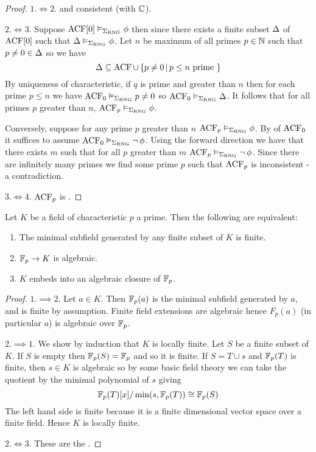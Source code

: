 \begin{proof}
  $1. \iff 2.$  and consistent (with $\mathbb{C}$).

  $2. \iff 3.$ Suppose $\operatorname{ACF}[0] \vDash_{\Sigma_{\mathrm{RNG}}} \phi$
  then since 
  there exists a finite subset $\Delta$ of $\operatorname{ACF}[0]$ such that
  $\Delta \vDash_{\Sigma_{\mathrm{RNG}}} \phi$.
  Let $n$ be maximum of all primes $p \in \mathbb{N}$ such that
  $p \ne 0 \in \Delta$ so we have
  \[\Delta \subseteq \operatorname{ACF} \cup \left\{p \ne 0 \,|\, p \leq n \text{ prime }\right\}\]
  By uniqueness of characteristic,
  if $q$ is prime and greater than $n$ then for each prime $p \leq n$
  we have $\operatorname{ACF}_{0} \vDash_{\Sigma_{\mathrm{RNG}}} p \ne 0$
  so $\operatorname{ACF}_{0} \vDash_{\Sigma_{\mathrm{RNG}}} \Delta$.
  It follows that for all primes $p$ greater than $n$,
  $\operatorname{ACF}_p \vDash_{\Sigma_{\mathrm{RNG}}} \phi$.

  Conversely, suppose for any prime $p$ greater than $n$
  $\operatorname{ACF}_p \vDash_{\Sigma_{\mathrm{RNG}}} \phi$.
  By  of
  $\operatorname{ACF}_{0}$ it suffices to assume $\operatorname{ACF}_{0} \vDash_{\Sigma_{\mathrm{RNG}}} \neg\, \phi$.
  Using the forward direction we have that there exists
  $m$ such that for all $p$ greater than $m$
  $\operatorname{ACF}_p \vDash_{\Sigma_{\mathrm{RNG}}} \neg\, \phi$.
  Since there are infinitely many primes we find some prime $p$
  such that $\operatorname{ACF}_{p}$ is inconsistent - a contradiction.

  $3. \iff 4.$ $\operatorname{ACF}_p$ is .
\end{proof}

\begin{dfn}
    Let $K$ be a field of characteristic $p$ a prime.
    Then the following are equivalent:
    \begin{enumerate}
        \item The minimal subfield generated by any finite subset of $K$ is finite.
        \item $\mathbb{F}_p \to K$ is algebraic.
        \item $K$ embeds into an algebraic closure of $\mathbb{F}_p$.
    \end{enumerate}
\end{dfn}
\begin{proof}
  $1.\implies 2.$
  Let $a \in K$. Then $\mathbb{F}_{p}(a)$ is the minimal subfield generated by $a$,
  and is finite by assumption.
  Finite field extensions are algebraic hence $F_{p}(a)$
  (in particular $a$) is algebraic over $\mathbb{F}_{p}$.

  $2. \implies 1.$ We show by induction that $K$ is locally
  finite.
  Let $S$ be a finite subset of $K$.
  If $S$ is empty then $\mathbb{F}_p(S) = \mathbb{F}_p$ and so it is finite.
  If $S = T \cup {s}$ and $\mathbb{F}_p(T)$ is finite,
  then $s \in K$ is algebraic so by some basic field theory we can
  take the quotient by the minimal polynomial of $s$ giving
  \[\mathbb{F}_p(T)[x] / \min (s, \mathbb{F}_p(T)) \cong \mathbb{F}_p(S)\]
  The left hand side is finite because it is a finite
  dimensional vector space over a finite field.
  Hence $K$ is locally finite.

  $2. \iff 3.$ These are the
  .
\end{proof}


